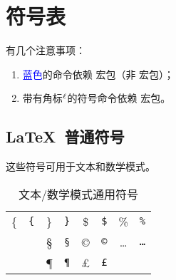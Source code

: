 \def\lsym{$\mathsurround=0pt {}^\ell$}
\def\LSYM    #1{$#1$     & \texttt{\string#1}\lsym}

\def\SYM     #1{$#1$     & \texttt{\string#1}}
\def\BIGSYM  #1{$#1$     & $\displaystyle #1$ & \texttt{\string#1}}
\def\ACC   #1#2{$#1{#2}$ & \texttt{\string#1}\marg*{#2}}
\def\DEL     #1{$\big#1 \bigg#1$ & \texttt{\string#1}}

\def\AMSSYM  #1{$#1$     & \texttt{\string#1}}
\def\AMSM    #1{$#1$     & \textcolor{blue}{\texttt{\string#1}}}
\def\AMSACC#1#2{$#1{#2}$ & \textcolor{blue}{\texttt{\string#1}}\marg*{#2}}
\def\AMSBIG  #1{$#1$     & $\displaystyle #1$ & \textcolor{blue}{\texttt{\string#1}}}

\def\SC      #1{#1       & \texttt{\string#1}}


\newsavebox{\symbbox}
\newenvironment{symbols}[1]%
  {\def\arraystretch{1.1}
  \begin{lrbox}{\symbbox}
  \begin{tabular}{@{}#1@{}}}%
  {\end{tabular}\end{lrbox}\makebox[\linewidth]{\usebox{\symbbox}}}

\newcount\savesecdepth

\clearpage
\section{符号表}\label{sec:math-tables}

有几个注意事项：
\begin{enumerate}
  \item \textcolor{blue}{蓝色}的命令依赖  宏包（非  宏包）；
  \item 带有角标\lsym 的符号命令依赖  宏包。
\end{enumerate}

\subsection{\LaTeX\ 普通符号}

\begin{table}[htp]
\caption{文本/数学模式通用符号}\label{tbl:general-syms}
\begin{trivlist}\item\relax\small%
这些符号可用于文本和数学模式。
\end{trivlist}
\begin{symbols}{*4{cl}}
\hline
 \SC{\{}    &  \SC{\}}  &  \SC{\$}         &  \SC{\%}               \\
 \SC{\dag}  &  \SC{\S}  &  \SC{\copyright} &  \SC{\dots}            \\
 \SC{\ddag} &  \SC{\P}  &  \SC{\pounds}    &                        \\
\hline
\end{symbols}
\end{table}

